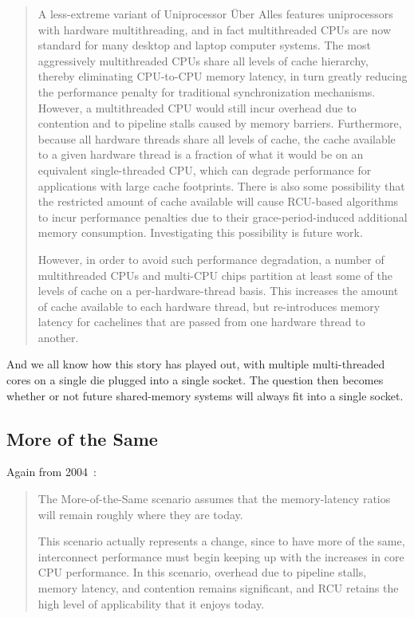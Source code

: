 \begin{quote}
	A less-extreme variant of Uniprocessor \"Uber Alles features
	uniprocessors with hardware multithreading, and in fact
	multithreaded CPUs are now standard for many desktop and laptop
	computer systems.
	The most aggressively multithreaded CPUs share all levels of
	cache hierarchy, thereby eliminating CPU-to-CPU memory latency,
	in turn greatly reducing the performance penalty for traditional
	synchronization mechanisms.
	However, a multithreaded CPU would still incur overhead due to
	contention and to pipeline stalls caused by memory barriers.
	Furthermore, because all hardware threads share all levels
	of cache, the cache available to a given hardware thread is a
	fraction of what it would be on an equivalent single-threaded
	CPU, which can degrade performance for applications with large
	cache footprints.
	There is also some possibility that the restricted amount of cache
	available will cause RCU-based algorithms to incur performance
	penalties due to their grace-period-induced additional memory
	consumption.
	Investigating this possibility is future work.

	However, in order to avoid such performance degradation, a number
	of multithreaded CPUs and multi-CPU chips partition at least
	some of the levels of cache on a per-hardware-thread basis.
	This increases the amount of cache available to each hardware
	thread, but re-introduces memory latency for cachelines that
	are passed from one hardware thread to another.
\end{quote}

And we all know how this story has played out, with multiple multi-threaded
cores on a single die plugged into a single socket.
The question then becomes whether or not future shared-memory systems will
always fit into a single socket.

\subsection{More of the Same}
\label{sec:meas:More of the Same}

Again from 2004~\cite{PaulEdwardMcKenneyPhD}:

\begin{quote}
	The More-of-the-Same scenario assumes that the memory-latency
	ratios will remain roughly where they are today.

	This scenario actually represents a change, since to have more
	of the same, interconnect performance must begin keeping up
	with the  increases in core CPU performance.
	In this scenario, overhead due to pipeline stalls, memory latency,
	and contention remains significant, and RCU retains the high
	level of applicability that it enjoys today.
\end{quote}

